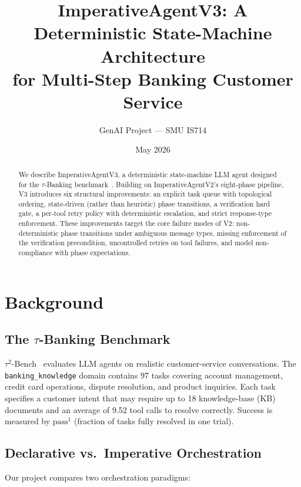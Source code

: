 \documentclass[11pt,a4paper]{article}
\title{\textbf{ImperativeAgentV3: A Deterministic State-Machine Architecture\\
for Multi-Step Banking Customer Service}}
\author{GenAI Project --- SMU IS714}
\date{May 2026}
\begin{document}
\maketitle

\begin{abstract}
We describe ImperativeAgentV3, a deterministic state-machine LLM agent designed for the
$\tau$-Banking benchmark~\cite{tau2bench}. Building on ImperativeAgentV2's eight-phase pipeline,
V3 introduces six structural improvements: an explicit task queue with topological ordering,
state-driven (rather than heuristic) phase transitions, a verification hard gate, a per-tool
retry policy with deterministic escalation, and strict response-type enforcement. These
improvements target the core failure modes of V2: non-deterministic phase transitions under
ambiguous message types, missing enforcement of the verification precondition, uncontrolled
retries on tool failures, and model non-compliance with phase expectations.
\end{abstract}

\tableofcontents
\newpage

\section{Background}

\subsection{The $\tau$-Banking Benchmark}

$\tau^2$-Bench~\cite{tau2bench} evaluates LLM agents on realistic customer-service conversations.
The \texttt{banking\_knowledge} domain contains 97 tasks covering account management, credit card
operations, dispute resolution, and product inquiries. Each task specifies a customer intent that
may require up to 18 knowledge-base (KB) documents and an average of 9.52 tool calls to resolve
correctly. Success is measured by $\text{pass}^1$ (fraction of tasks fully resolved in one trial).

\subsection{Declarative vs.\ Imperative Orchestration}

Our project compares two orchestration paradigms:
\end{document}
